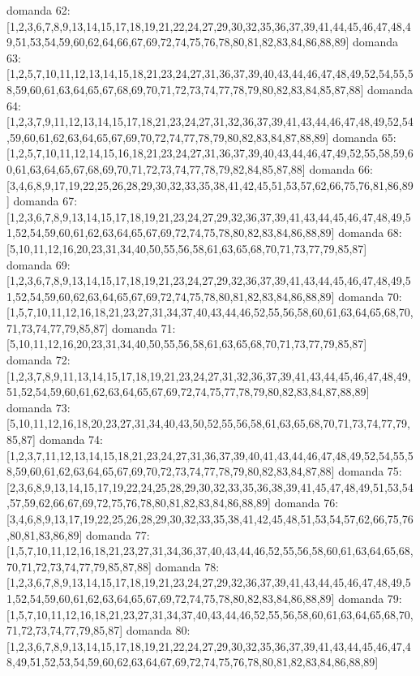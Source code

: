domanda 62:[1,2,3,6,7,8,9,13,14,15,17,18,19,21,22,24,27,29,30,32,35,36,37,39,41,44,45,46,47,48,49,51,53,54,59,60,62,64,66,67,69,72,74,75,76,78,80,81,82,83,84,86,88,89]
domanda 63:[1,2,5,7,10,11,12,13,14,15,18,21,23,24,27,31,36,37,39,40,43,44,46,47,48,49,52,54,55,58,59,60,61,63,64,65,67,68,69,70,71,72,73,74,77,78,79,80,82,83,84,85,87,88]
domanda 64:[1,2,3,7,9,11,12,13,14,15,17,18,21,23,24,27,31,32,36,37,39,41,43,44,46,47,48,49,52,54,59,60,61,62,63,64,65,67,69,70,72,74,77,78,79,80,82,83,84,87,88,89]
domanda 65:[1,2,5,7,10,11,12,14,15,16,18,21,23,24,27,31,36,37,39,40,43,44,46,47,49,52,55,58,59,60,61,63,64,65,67,68,69,70,71,72,73,74,77,78,79,82,84,85,87,88]
domanda 66:[3,4,6,8,9,17,19,22,25,26,28,29,30,32,33,35,38,41,42,45,51,53,57,62,66,75,76,81,86,89]
domanda 67:[1,2,3,6,7,8,9,13,14,15,17,18,19,21,23,24,27,29,32,36,37,39,41,43,44,45,46,47,48,49,51,52,54,59,60,61,62,63,64,65,67,69,72,74,75,78,80,82,83,84,86,88,89]
domanda 68:[5,10,11,12,16,20,23,31,34,40,50,55,56,58,61,63,65,68,70,71,73,77,79,85,87]
domanda 69:[1,2,3,6,7,8,9,13,14,15,17,18,19,21,23,24,27,29,32,36,37,39,41,43,44,45,46,47,48,49,51,52,54,59,60,62,63,64,65,67,69,72,74,75,78,80,81,82,83,84,86,88,89]
domanda 70:[1,5,7,10,11,12,16,18,21,23,27,31,34,37,40,43,44,46,52,55,56,58,60,61,63,64,65,68,70,71,73,74,77,79,85,87]
domanda 71:[5,10,11,12,16,20,23,31,34,40,50,55,56,58,61,63,65,68,70,71,73,77,79,85,87]
domanda 72:[1,2,3,7,8,9,11,13,14,15,17,18,19,21,23,24,27,31,32,36,37,39,41,43,44,45,46,47,48,49,51,52,54,59,60,61,62,63,64,65,67,69,72,74,75,77,78,79,80,82,83,84,87,88,89]
domanda 73:[5,10,11,12,16,18,20,23,27,31,34,40,43,50,52,55,56,58,61,63,65,68,70,71,73,74,77,79,85,87]
domanda 74:[1,2,3,7,11,12,13,14,15,18,21,23,24,27,31,36,37,39,40,41,43,44,46,47,48,49,52,54,55,58,59,60,61,62,63,64,65,67,69,70,72,73,74,77,78,79,80,82,83,84,87,88]
domanda 75:[2,3,6,8,9,13,14,15,17,19,22,24,25,28,29,30,32,33,35,36,38,39,41,45,47,48,49,51,53,54,57,59,62,66,67,69,72,75,76,78,80,81,82,83,84,86,88,89]
domanda 76:[3,4,6,8,9,13,17,19,22,25,26,28,29,30,32,33,35,38,41,42,45,48,51,53,54,57,62,66,75,76,80,81,83,86,89]
domanda 77:[1,5,7,10,11,12,16,18,21,23,27,31,34,36,37,40,43,44,46,52,55,56,58,60,61,63,64,65,68,70,71,72,73,74,77,79,85,87,88]
domanda 78:[1,2,3,6,7,8,9,13,14,15,17,18,19,21,23,24,27,29,32,36,37,39,41,43,44,45,46,47,48,49,51,52,54,59,60,61,62,63,64,65,67,69,72,74,75,78,80,82,83,84,86,88,89]
domanda 79:[1,5,7,10,11,12,16,18,21,23,27,31,34,37,40,43,44,46,52,55,56,58,60,61,63,64,65,68,70,71,72,73,74,77,79,85,87]
domanda 80:[1,2,3,6,7,8,9,13,14,15,17,18,19,21,22,24,27,29,30,32,35,36,37,39,41,43,44,45,46,47,48,49,51,52,53,54,59,60,62,63,64,67,69,72,74,75,76,78,80,81,82,83,84,86,88,89]
